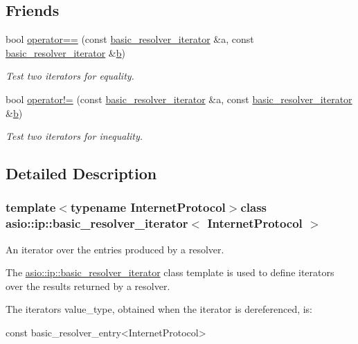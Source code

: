 \subsection*{Friends}
\begin{DoxyCompactItemize}
\item 
bool \hyperlink{classasio_1_1ip_1_1basic__resolver__iterator_a969344b6cd8a7d3261cc72d90d92d339}{operator==} (const \hyperlink{classasio_1_1ip_1_1basic__resolver__iterator}{basic\+\_\+resolver\+\_\+iterator} \&a, const \hyperlink{classasio_1_1ip_1_1basic__resolver__iterator}{basic\+\_\+resolver\+\_\+iterator} \&\hyperlink{group__async__read_ga945a5c18fa77a9e2eba420f8f44b2a4f}{b})
\begin{DoxyCompactList}\small\item\em Test two iterators for equality. \end{DoxyCompactList}\item 
bool \hyperlink{classasio_1_1ip_1_1basic__resolver__iterator_af2f9de78dc2db01e2ba66ee2b71a855a}{operator!=} (const \hyperlink{classasio_1_1ip_1_1basic__resolver__iterator}{basic\+\_\+resolver\+\_\+iterator} \&a, const \hyperlink{classasio_1_1ip_1_1basic__resolver__iterator}{basic\+\_\+resolver\+\_\+iterator} \&\hyperlink{group__async__read_ga945a5c18fa77a9e2eba420f8f44b2a4f}{b})
\begin{DoxyCompactList}\small\item\em Test two iterators for inequality. \end{DoxyCompactList}\end{DoxyCompactItemize}


\subsection{Detailed Description}
\subsubsection*{template$<$typename Internet\+Protocol$>$class asio\+::ip\+::basic\+\_\+resolver\+\_\+iterator$<$ Internet\+Protocol $>$}

An iterator over the entries produced by a resolver. 

The \hyperlink{classasio_1_1ip_1_1basic__resolver__iterator}{asio\+::ip\+::basic\+\_\+resolver\+\_\+iterator} class template is used to define iterators over the results returned by a resolver.

The iterator\textquotesingle{}s value\+\_\+type, obtained when the iterator is dereferenced, is\+: 
\begin{DoxyCode}
\textcolor{keyword}{const} basic\_resolver\_entry<InternetProtocol> 
\end{DoxyCode}


